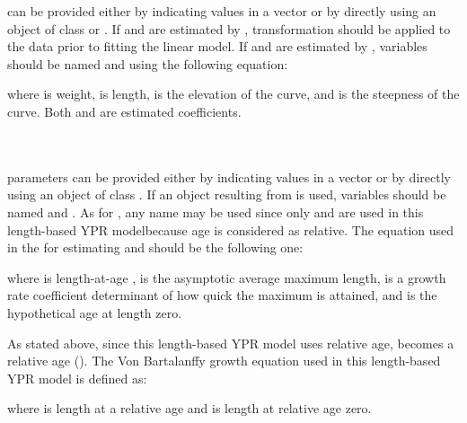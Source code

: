 \documentclass[a4paper]{book}
\begin{document}
\begin{Details}\relax
{} can be provided either by indicating  values in a vector or by 
directly using an object of class  or . If \eqn{\alpha}{} and \eqn{\beta}{} are estimated 
by ,  transformation should be applied to the data prior to fitting the linear model. 
If \eqn{\alpha}{} and \eqn{\beta}{} are estimated by , variables should be named  and  
using the following equation:

where  is weight,  is length, \eqn{\alpha}{} is the elevation of the curve, and \eqn{\beta}{} 
is the steepness of the curve. Both \eqn{\alpha}{} and \eqn{\beta}{} are estimated coefficients.\\{}\\{}\\{}


 parameters can be provided either by indicating  values in a vector or by 
directly using an object of class . If an object resulting from  is used, variables 
should be named  and . As for , any name may be used since only  and  are 
used in this length-based YPR modelbecause age is considered as relative. The equation used in the  for estimating  
and  should be the following one:

where  is length-at-age ,  is the asymptotic average maximum length, 
 is a growth rate coefficient determinant of how quick the maximum is attained, and  
is the hypothetical age at length zero.

As stated above, since this length-based YPR model uses relative age,  becomes a relative age (). 
The Von Bartalanffy growth equation used in this length-based YPR model is defined as:

where  is length at a relative age  and  is length at relative age zero.\\{}\\{}



\end{Details}
\end{document}
